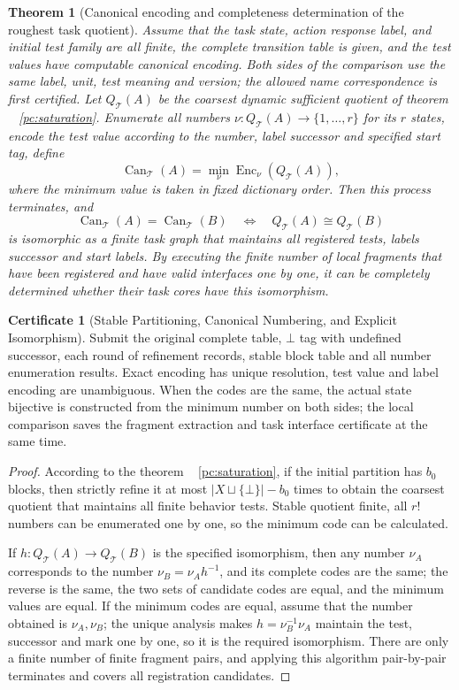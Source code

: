 \documentclass[11pt,a4paper]{article}
\theoremstyle{plain}
\newtheorem{theorem}{Theorem}[section]
\theoremstyle{definition}
\newtheorem*{certificate}{Certificate}
\theoremstyle{remark}
\begin{document}
\begin{CJK*}
\begin{theorem}
[Canonical encoding and completeness determination of the roughest task quotient]\label{ar:canonical}
Assume that the task state, action response label, and initial test family are all finite, the complete transition table is given, and the test values have computable canonical encoding. Both sides of the comparison use the same label, unit, test meaning and version; the allowed name correspondence is first certified. Let $Q_{\mathcal T}(A)$ be the coarsest dynamic sufficient quotient of theorem ~ \ref{pc:saturation}. Enumerate all numbers $\nu:Q_{\mathcal T}(A)\to\{1,\ldots,r\}$ for its $r$ states, encode the test value according to the number, label successor and specified start tag, define \[
 \operatorname{Can}_{\mathcal T}(A)
 =\min_{\nu}\operatorname{Enc}_{\nu}(Q_{\mathcal T}(A)),
\] where the minimum value is taken in fixed dictionary order. Then this process terminates, and \[
 \operatorname{Can}_{\mathcal T}(A)=\operatorname{Can}_{\mathcal T}(B)
 \quad\Longleftrightarrow\quad
 Q_{\mathcal T}(A)\cong Q_{\mathcal T}(B)
\] is isomorphic as a finite task graph that maintains all registered tests, labels successor and start labels. By executing the finite number of local fragments that have been registered and have valid interfaces one by one, it can be completely determined whether their task cores have this isomorphism.\end{theorem}
\begin{certificate}
[Stable Partitioning, Canonical Numbering, and Explicit Isomorphism]Submit the original complete table, $\bot$ tag with undefined successor, each round of refinement records, stable block table and all number enumeration results. Exact encoding has unique resolution, test value and label encoding are unambiguous. When the codes are the same, the actual state bijective is constructed from the minimum number on both sides; the local comparison saves the fragment extraction and task interface certificate at the same time.\end{certificate}
\begin{proof}
According to the theorem ~ \ref{pc:saturation}, if the initial partition has $b_0$ blocks, then strictly refine it at most $|X\sqcup\{\bot\}|-b_0$ times to obtain the coarsest quotient that maintains all finite behavior tests. Stable quotient finite, all $r!$ numbers can be enumerated one by one, so the minimum code can be calculated.

If $h:Q_{\mathcal T}(A)\to Q_{\mathcal T}(B)$ is the specified isomorphism, then any number $\nu_A$ corresponds to the number $\nu_B=\nu_Ah^{-1}$, and its complete codes are the same; the reverse is the same, the two sets of candidate codes are equal, and the minimum values are equal. If the minimum codes are equal, assume that the number obtained is $\nu_A,\nu_B$; the unique analysis makes $h=\nu_B^{-1}\nu_A$ maintain the test, successor and mark one by one, so it is the required isomorphism. There are only a finite number of finite fragment pairs, and applying this algorithm pair-by-pair terminates and covers all registration candidates.\end{proof}



\end{CJK*}
\end{document}
